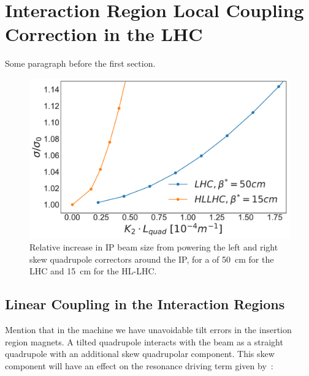\chapter{Interaction Region Local Coupling Correction in the LHC} %

\label{Chapter:IR_Local_Coupling} %


Some paragraph before the first section.

\begin{figure}
    \centering
    \includegraphics*[width=0.9\linewidth]{Figures/Chapter4/lhc_vs_hllhc_ratios_normalised.pdf}
    \caption{Relative increase in IP beam size from powering the left and right skew quadrupole correctors around the IP, for a \betastar of \qty{50}{\centi\metre} for the LHC and \qty{15}{\centi\meter} for the HL-LHC.}
    \label{figure:lhc_vs_hllhc_ratios}
\end{figure}


\section{Linear Coupling in the Interaction Regions}

Mention that in the machine we have unavoidable tilt errors in the insertion region magnets.
A tilted quadrupole interacts with the beam as a straight quadrupole with an additional skew quadrupolar component.
This skew component will have an effect on the \foneohone resonance driving term given by~\cite{PRAB:Calaga:MergingHamiltonianMatrixApproches}:

